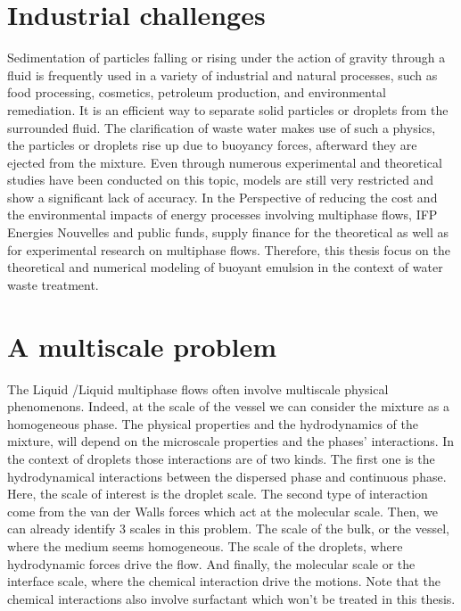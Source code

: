 \label{part:intro}

\section{Industrial challenges} 
Sedimentation of particles falling or rising under the action of gravity through a fluid is frequently used in a variety of industrial and natural processes, such as food processing, cosmetics, petroleum production, and environmental remediation. 
It is an efficient way to separate solid particles or droplets from the surrounded fluid. 
The clarification of waste water makes use of such a physics, the particles or droplets rise up due to buoyancy forces, afterward they are ejected from the mixture.
Even through numerous experimental and theoretical studies have been conducted on this topic, models are still very restricted and show a significant lack of accuracy. 
In the Perspective of reducing the cost and the environmental impacts of energy processes involving multiphase flows, IFP Energies Nouvelles and public funds, supply finance for the theoretical as well as for experimental research on multiphase flows.
Therefore, this thesis focus on the theoretical and numerical modeling of buoyant emulsion in the context of water waste treatment.  


\section{A multiscale problem} 
The Liquid /Liquid multiphase flows often involve multiscale physical phenomenons. 
Indeed, at the scale of the vessel we can consider the mixture as a homogeneous phase.
The physical properties and the hydrodynamics of the mixture, will depend on the microscale properties and the phases' interactions.
In the context of droplets those interactions are of two kinds. 
The first one is the hydrodynamical interactions between the dispersed phase and continuous phase.
Here, the scale of interest is the droplet scale.
The second type of interaction come from the van der Walls forces which act at the molecular scale. 
Then, we can already identify $3$ scales in this problem.
The scale of the bulk, or the vessel, where the medium seems homogeneous. 
The scale of the droplets, where hydrodynamic forces drive the flow. 
And finally, the molecular scale or the interface scale, where the chemical interaction drive the motions. 
Note that the chemical interactions also involve surfactant which won't be treated in this thesis. 

